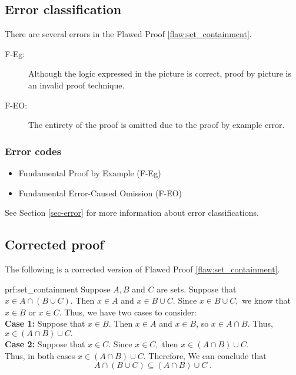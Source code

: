 \clearpage
\subsection{Error classification}

There are several errors
 in the Flawed Proof \ref{flaw:set_containment}. 

 
 \begin{description}
 	\item[F-Eg:] Although the logic expressed in the picture is correct, proof by picture is an invalid proof technique. 
 	\item[F-EO:] The entirety of the proof is omitted due to the proof by example error.  
 \end{description}

 
\subsubsection{Error codes}
\begin{itemize}
	\item 	Fundamental Proof by Example (F-Eg)
	\item   Fundamental Error-Caused Omission (F-EO)
\end{itemize}
See Section \ref{sec-error} for more information about error classifications.

\clearpage
\subsection{Corrected proof}

The following is a corrected version of Flawed Proof \ref{flaw:set_containment}. 

\begin{prf}{prf:set_containment} 
Suppose $A, B$ and $C$ are sets. Suppose that $x \in A \cap \left(B \cup C \right).$ Then $x\in A$ and $x \in B \cup C.$ Since $x \in B \cup C,$ we know that $x \in B$ or $x \in C.$ Thus, we have two cases to consider: \\

\noindent \textbf{Case 1:} Suppose that $x \in B$. Then $x \in A$ and $x \in B$, so $x \in A \cap B$. Thus, $x \in \left(A \cap B\right) \cup C.$ \\
\textbf{Case 2:}  Suppose that $x \in C$. Since $x \in C,$ then $x \in \left(A \cap B\right) \cup C.$ \\

\noindent Thus, in both cases $x \in \left(A \cap B\right) \cup C.$ Therefore, We can conclude that $$A \cap \left(B \cup C \right) \subseteq \left(A \cap B\right) \cup C\;.$$
\end{prf}